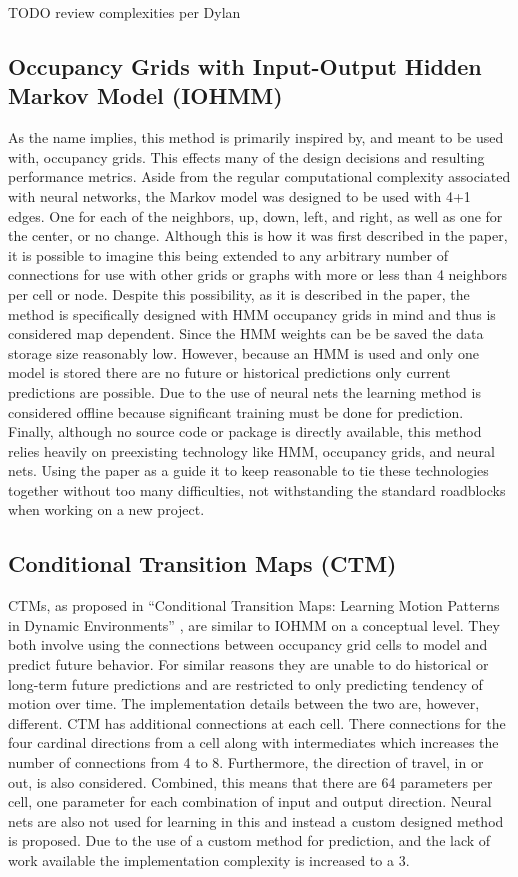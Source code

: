   TODO review complexities per Dylan

  \subsection { Occupancy Grids with Input-Output Hidden Markov Model (IOHMM) }
  As the name implies, this method is primarily inspired by, and meant to be
  used with, occupancy grids. This effects many of the design decisions and
  resulting performance metrics. Aside from the regular computational complexity
  associated with neural networks, the Markov model was designed to be
  used with 4+1 edges. One for each of the neighbors, up, down, left, and right,
  as well as one for the center, or no change. Although this is how it was first
  described in the paper, it is possible to imagine this being extended to any
  arbitrary number of connections for use with other grids or graphs with more
  or less than 4 neighbors per cell or node. Despite this possibility, as it is
  described in the paper, the method is specifically designed with HMM occupancy
  grids in mind and thus is considered map dependent. Since the HMM weights can be
  be saved the data storage size reasonably low. However, because an HMM is used
  and only one model is stored there are no future or historical predictions
  only current predictions are possible. Due to the use of neural nets
  the learning method is considered offline because significant training must be
  done for prediction. Finally, although no source code or package is directly
  available, this method relies heavily on preexisting technology like HMM,
  occupancy grids, and neural nets. Using the paper as a guide it to keep
  reasonable to tie these technologies together without too many difficulties,
  not withstanding the standard roadblocks when working on a new project. \\

  \subsection { Conditional Transition Maps (CTM) }
  CTMs, as proposed in ``Conditional Transition Maps: Learning Motion Patterns
  in Dynamic Environments'' \cite{Kucner2013}, are similar to IOHMM on a conceptual
  level. They both involve using the connections between occupancy grid cells
  to model and predict future behavior. For similar reasons they are unable to
  do historical or long-term future predictions and are restricted to only
  predicting tendency of motion over time. The implementation details between
  the two are, however, different. CTM has additional connections at each cell.
  There connections for the four cardinal directions from a cell
  along with intermediates which increases the number of connections
  from 4 to 8. Furthermore, the direction of travel, in or out, is also
  considered. Combined, this means that there are 64 parameters per cell, one
  parameter for each combination of input and output direction. Neural nets
  are also not used for learning in this and instead a custom designed
  method is proposed. Due to the use of a custom method for prediction, and
  the lack of work available the implementation complexity is increased to a 3. \\

